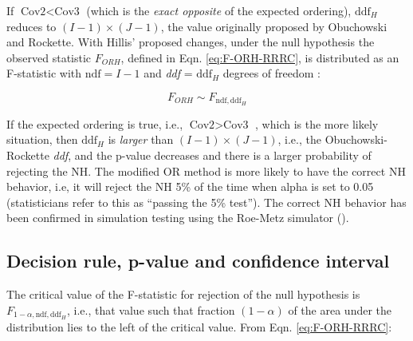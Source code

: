 \documentclass[
]{book}
\begin{document}
If \(\text{Cov2} < \text{Cov3}\) (which is the \emph{exact opposite} of the expected ordering), \(\text{ddf}_H\) reduces to \((I-1)\times(J-1)\), the value originally proposed by Obuchowski and Rockette. With Hillis' proposed changes, under the null hypothesis the observed statistic \(F_{ORH}\), defined in Eqn. \eqref{eq:F-ORH-RRRC}, is distributed as an F-statistic with \(\text{ndf} = I-1\) and \emph{ddf} = \(\text{ddf}_H\) degrees of freedom \citep{RN1772, RN1865, RN1866}:

\begin{equation}
F_{ORH}\sim F_{\text{ndf},\text{ddf}_H}
\label{eq:SamplingDistr-F-ORH-RRRC}
\end{equation}

If the expected ordering is true, i.e., \(\text{Cov2} > \text{Cov3}\) , which is the more likely situation, then \(\text{ddf}_H\) is \emph{larger} than \((I-1)\times(J-1)\), i.e., the Obuchowski-Rockette \emph{ddf}, and the p-value decreases and there is a larger probability of rejecting the NH. The modified OR method is more likely to have the correct NH behavior, i.e, it will reject the NH 5\% of the time when alpha is set to 0.05 (statisticians refer to this as ``passing the 5\% test''). The correct NH behavior has been confirmed in simulation testing using the Roe-Metz simulator (\citet{RN1866}).

\hypertarget{decision-rule-p-value-and-confidence-interval}{%
\subsection{Decision rule, p-value and confidence interval}\label{decision-rule-p-value-and-confidence-interval}}

The critical value of the F-statistic for rejection of the null hypothesis is \(F_{1-\alpha,\text{ndf},\text{ddf}_H}\), i.e., that value such that fraction \((1-\alpha)\) of the area under the distribution lies to the left of the critical value. From Eqn. \eqref{eq:F-ORH-RRRC}:
\end{document}
